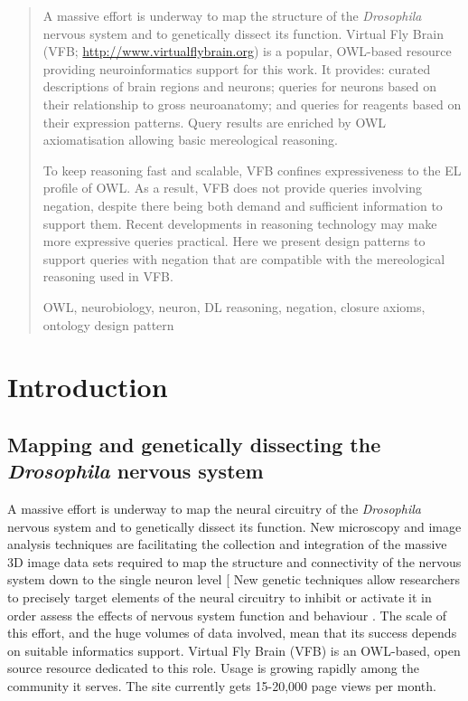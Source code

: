 \documentclass[runningheads,a4paper]{llncs}
\newcommand{\keywords}[1]{\par\addvspace\baselineskip
\noindent\keywordname\enspace\ignorespaces#1}
\begin{document}
\begin{abstract}
A massive effort is underway to map the structure of the \textit{Drosophila}
nervous system and to genetically dissect its function. Virtual Fly
Brain (VFB; \url{http://www.virtualflybrain.org}) is a popular, OWL-based resource
providing neuroinformatics support for this work.  It provides: curated
descriptions of brain regions and neurons; queries for neurons based
on their relationship to gross neuroanatomy; and queries for reagents
based on their expression patterns. Query results are enriched by OWL
axiomatisation allowing basic mereological reasoning.

To keep reasoning fast and scalable, VFB confines expressiveness to
the EL profile of OWL. As a result, VFB does not provide queries
involving negation, despite there being both demand and sufficient
information to support them. Recent developments in
reasoning technology may make more expressive queries practical.  Here
we present design patterns to support queries with negation that are
compatible with the mereological reasoning used in VFB.

\keywords{OWL, neurobiology, neuron, DL reasoning, negation, closure
  axioms, ontology design pattern}
\end{abstract}

\section{Introduction}


\subsection{Mapping and genetically dissecting the \textit{Drosophila}
  nervous system}


A massive effort is underway to map the neural circuitry of the
\textit{Drosophila} nervous system and to genetically dissect its
function. New microscopy and image analysis techniques are
facilitating the collection and integration of the massive 3D image
data sets required to map the structure and connectivity of the
nervous system down to the single neuron level
[\cite{pmid21129968,Manton2014} New genetic
techniques allow researchers to precisely target elements of the
neural circuitry to inhibit or activate it in order assess the effects
of nervous system function and behaviour \cite{pmid22205518}. The scale of this 
effort, and the huge volumes of data involved, mean that its success
depends on suitable informatics support. Virtual Fly Brain (VFB)
\cite{pmid22180411,pmid22402613} is an OWL-based, open source
resource dedicated to this role. Usage is growing rapidly among the community
it serves.  The site currently gets 15-20,000 page views per month.
\end{document}
